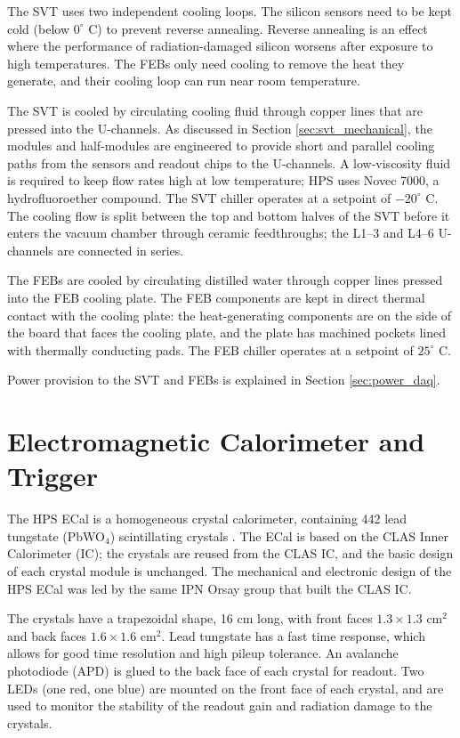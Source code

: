The SVT uses two independent cooling loops.
The silicon sensors need to be kept cold (below $0^\circ$ C) to prevent reverse annealing.
Reverse annealing is an effect where the performance of radiation-damaged silicon worsens after exposure to high temperatures.
The FEBs only need cooling to remove the heat they generate, and their cooling loop can run near room temperature.

The SVT is cooled by circulating cooling fluid through copper lines that are pressed into the U-channels.
As discussed in Section \ref{sec:svt_mechanical}, the modules and half-modules are engineered to provide short and parallel cooling paths from the sensors and readout chips to the U-channels.
A low-viscosity fluid is required to keep flow rates high at low temperature; HPS uses Novec 7000, a hydrofluoroether compound.
The SVT chiller operates at a setpoint of $-20^\circ$ C.
The cooling flow is split between the top and bottom halves of the SVT before it enters the vacuum chamber through ceramic feedthroughs; the L1--3 and L4--6 U-channels are connected in series.

The FEBs are cooled by circulating distilled water through copper lines pressed into the FEB cooling plate.
The FEB components are kept in direct thermal contact with the cooling plate: the heat-generating components are on the side of the board that faces the cooling plate, and the plate has machined pockets lined with thermally conducting pads.
The FEB chiller operates at a setpoint of $25^\circ$ C.

Power provision to the SVT and FEBs is explained in Section \ref{sec:power_daq}.

\section{Electromagnetic Calorimeter and Trigger}
The HPS ECal is a homogeneous crystal calorimeter, containing 442 lead tungstate (PbWO$_4$) scintillating crystals \cite{balossino_hps_2016}.
The ECal is based on the CLAS Inner Calorimeter (IC); the crystals are reused from the CLAS IC, and the basic design of each crystal module is unchanged.
The mechanical and electronic design of the HPS ECal was led by the same IPN Orsay group that built the CLAS IC.

The crystals have a trapezoidal shape, 16 cm long, with front faces $1.3\times 1.3$ cm$^2$ and back faces $1.6\times 1.6$ cm$^2$.
Lead tungstate has a fast time response, which allows for good time resolution and high pileup tolerance.
An avalanche photodiode (APD) is glued to the back face of each crystal for readout.
Two LEDs (one red, one blue) are mounted on the front face of each crystal, and are used to monitor the stability of the readout gain and radiation damage to the crystals.

